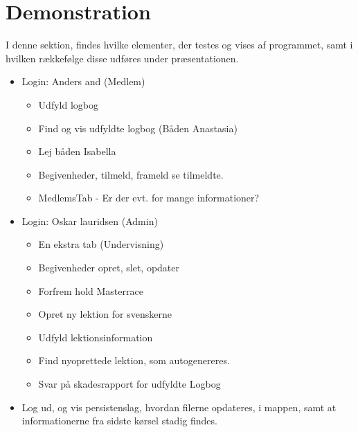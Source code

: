 \documentclass[a4paper,11pt,fleqn,twoside,openright,final]{memoir}
\begin{document}
\newpage
\section{Demonstration}

I denne sektion, findes hvilke elementer, der testes og vises af programmet, samt i hvilken rækkefølge disse udføres under præsentationen.

\begin{itemize}
	\item Login: Anders and (Medlem)
		\begin{itemize}
			\item Udfyld logbog
			\item Find og vis udfyldte logbog (Båden Anastasia)
			\item Lej båden Isabella
			\item Begivenheder, tilmeld, frameld se tilmeldte.
			\item MedlemsTab - Er der evt. for mange informationer?
		\end{itemize}
	\item Login: Oskar lauridsen (Admin)
		\begin{itemize}
			\item En ekstra tab (Undervisning)
			\item Begivenheder opret, slet, opdater
			\item Forfrem hold Masterrace
			\item Opret ny lektion for svenskerne
			\item Udfyld lektionsinformation
			\item Find nyoprettede lektion, som autogenereres. 
			\item Svar på skadesrapport for udfyldte Logbog
		\end{itemize}
	\item Log ud, og vis persistenslag, hvordan filerne opdateres, i mappen, samt at informationerne fra sidste kørsel stadig findes.
\end{itemize}
\end{document}
